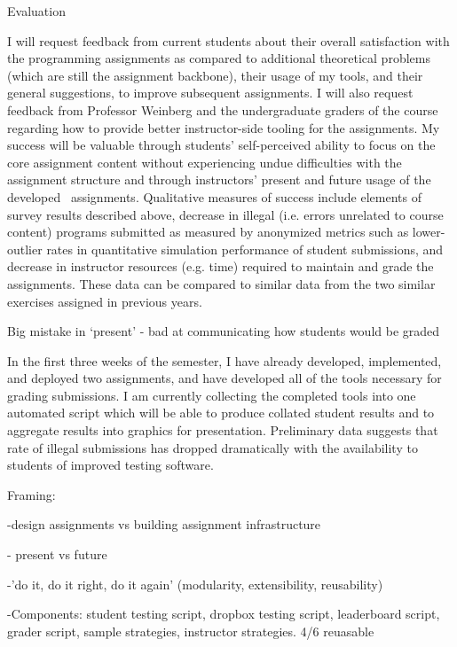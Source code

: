 \documentclass[]{article}
\begin{document}
{Evaluation}

{I will request feedback from current students about their overall
satisfaction with the programming assignments as compared to additional
theoretical problems (which are still the assignment backbone), their
usage of my tools, and their general suggestions, to improve subsequent
assignments. I will also request feedback from Professor Weinberg and
the undergraduate graders of the course regarding how to provide better
instructor-side tooling for the assignments. My success will be valuable
through students' self-perceived ability to focus on the core assignment
content without experiencing undue difficulties with the assignment
structure and through instructors' present and future usage of the
developed ~assignments. Qualitative measures of success include elements
of survey results described above, decrease in illegal (i.e. errors
unrelated to course content) programs submitted as measured by
anonymized metrics such as lower-outlier rates in quantitative
simulation performance of student submissions, and decrease in
instructor resources (e.g. time) required to maintain and grade the
assignments. These data can be compared to similar data from the two
similar exercises assigned in previous years.}

{Big mistake in `present' - bad at communicating how students would be
graded}

{In the first three weeks of the semester, I have already developed,
implemented, and deployed two assignments, and have developed all of the
tools necessary for grading submissions. I am currently collecting the
completed tools into one automated script which will be able to produce
collated student results and to aggregate results into graphics for
presentation. Preliminary data suggests that rate of illegal submissions
has dropped dramatically with the availability to students of improved
testing software.}

{}

{}

{Framing:}

{-design assignments vs building assignment infrastructure}

{- present vs future}

{-'do it, do it right, do it again' (modularity, extensibility,
reusability)}

{-Components: student testing script, dropbox testing script,
leaderboard script, grader script, sample strategies, instructor
strategies. 4/6 reuasable}
\end{document}
